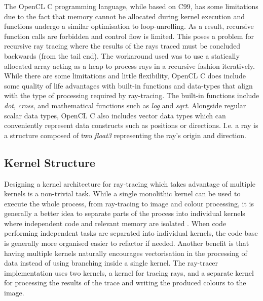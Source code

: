 \documentclass[final]{cmpreport}
\begin{document}
The OpenCL C programming language, while based on C99, has some limitations due to the fact that memory cannot be allocated during kernel execution and functions undergo a similar optimisation to loop-unrolling. As a result, recursive function calls are forbidden and control flow is limited. This poses a problem for recursive ray tracing where the results of the rays traced must be concluded backwards (from the tail end). The workaround used was to use a statically allocated array acting as a heap to process rays in a recursive fashion iteratively. \citep{gaster2012heterogeneous} While there are some limitations and little flexibility, OpenCL C does include some quality of life advantages with built-in functions and data-types that align with the type of processing required by ray-tracing. The built-in functions include \textit{dot}, \textit{cross}, and mathematical functions such as \textit{log} and \textit{sqrt}. Alongside regular scalar data types, OpenCL C also includes vector data types which can conveniently represent data constructs such as positions or directions. I.e. a ray is a structure composed of two \textit{float3} representing the ray's origin and direction.

\subsection{Kernel Structure}

Designing a kernel architecture for ray-tracing which takes advantage of multiple kernels is a non-trivial task. While a single monolithic kernel can be used to execute the whole process, from ray-tracing to image and colour processing, it is generally a better idea to separate parts of the process into individual kernels where independent code and relevant memory are isolated \citep{laine2013megakernels}. When code performing independent tasks are separated into individual kernels, the code base is generally more organised easier to refactor if needed. Another benefit is that having multiple kernels naturally encourages vectorisation in the processing of data instead of using branching inside a single kernel. The ray-tracer implementation uses two kernels, a kernel for tracing rays, and a separate kernel for processing the results of the trace and writing the produced colours to the image.
\end{document}
